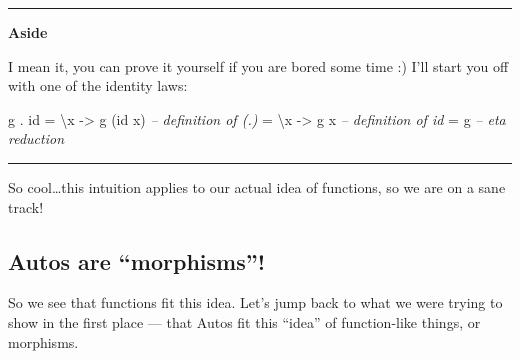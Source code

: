 \documentclass[]{article}
\newenvironment{Shaded}{}{}
\newcommand{\DecValTok}[1]{\textcolor[rgb]{0.25,0.63,0.44}{{#1}}}
\newcommand{\CommentTok}[1]{\textcolor[rgb]{0.38,0.63,0.69}{\textit{{#1}}}}
\newcommand{\OtherTok}[1]{\textcolor[rgb]{0.00,0.44,0.13}{{#1}}}
\newcommand{\FunctionTok}[1]{\textcolor[rgb]{0.02,0.16,0.49}{{#1}}}
\newcommand{\NormalTok}[1]{{#1}}
\begin{document}
\begin{Shaded}
\end{Shaded}

\begin{center}\rule{0.5\linewidth}{\linethickness}\end{center}

\textbf{Aside}

I mean it, you can prove it yourself if you are bored some time :) I'll
start you off with one of the identity laws:

\begin{Shaded}
\begin{Highlighting}[]
\NormalTok{g }\FunctionTok{.} \NormalTok{id }\FunctionTok{=} \NormalTok{\textbackslash{}x }\OtherTok{->} \NormalTok{g (id x)     }\CommentTok{-- definition of (.)}
       \FunctionTok{=} \NormalTok{\textbackslash{}x }\OtherTok{->} \NormalTok{g x          }\CommentTok{-- definition of id}
       \FunctionTok{=} \NormalTok{g                  }\CommentTok{-- eta reduction}
\end{Highlighting}
\end{Shaded}

\begin{center}\rule{0.5\linewidth}{\linethickness}\end{center}

So cool\ldots{}this intuition applies to our actual idea of functions,
so we are on a sane track!

\subsection{\texorpdfstring{Autos are
``morphisms''!}{Autos are morphisms!}}\label{autos-are-morphisms}

So we see that functions fit this idea. Let's jump back to what we were
trying to show in the first place --- that Autos fit this ``idea'' of
function-like things, or morphisms.
\end{document}
